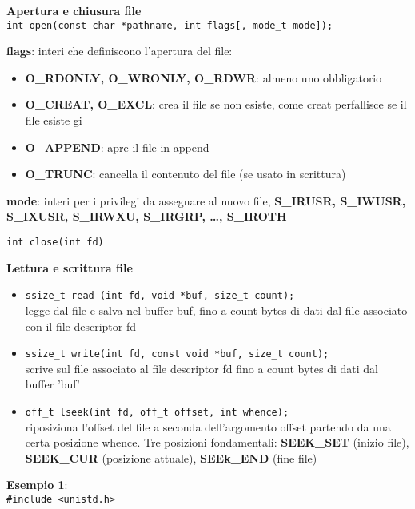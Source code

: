 \begin{flushleft}
\begin{itemize}
          \textbf{Apertura e chiusura file} \\
          \texttt{int open(const char *pathname, int flags[, mode\_t mode]);}\par 
          \textbf{flags}: interi che definiscono l'apertura del file:
          \begin{itemize}
            \item \textbf{O\_RDONLY, O\_WRONLY, O\_RDWR}: almeno uno \ace obbligatorio
            \item \textbf{O\_CREAT, O\_EXCL}: crea il file se non esiste, come creat per\aco fallisce se il file esiste gi\aca
            \item \textbf{O\_APPEND}: apre il file in append
            \item \textbf{O\_TRUNC}: cancella il contenuto del file (se usato in scrittura)
          \end{itemize}
          \textbf{mode}: interi per i privilegi da assegnare al nuovo file, \textbf{ S\_IRUSR, S\_IWUSR, S\_IXUSR, S\_IRWXU, S\_IRGRP, …, S\_IROTH}\par 
          \texttt{int close(int fd)}\par 
          \textbf{Lettura e scrittura file}\\
          \begin{itemize}
            \item \texttt{ssize\_t read (int fd, void *buf, size\_t count);}\\ legge dal file e salva nel buffer buf, 
                  fino a count bytes di dati dal file associato con il file descriptor fd
            \item \texttt{ssize\_t write(int fd, const void *buf, size\_t count);}\\ scrive sul file associato al file descriptor fd fino a count bytes di dati 
                  dal buffer 'buf'
            \item \texttt{off\_t lseek(int fd, off\_t offset, int whence);}\\ riposiziona l'offset del file a seconda dell'argomento 
                    offset partendo da una certa posizione whence. Tre posizioni fondamentali: \textbf{SEEK\_SET} (inizio file), \textbf{SEEK\_CUR} (posizione attuale), 
                    \textbf{SEEk\_END} (fine file)
          \end{itemize}          
          \begin{flushleft}
            \textbf{Esempio 1}: \\
            \texttt{\#include <unistd.h> \\
}
\end{flushleft}
\end{itemize}
\end{flushleft}
